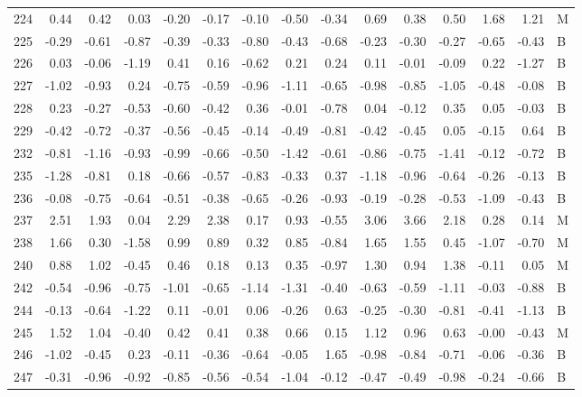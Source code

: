 \begin{table}[ht]
\begin{tabular}{rrrrrrrrrrrrrrl}
  224 & 0.44 & 0.42 & 0.03 & -0.20 & -0.17 & -0.10 & -0.50 & -0.34 & 0.69 & 0.38 & 0.50 & 1.68 & 1.21 & M \\ 
  225 & -0.29 & -0.61 & -0.87 & -0.39 & -0.33 & -0.80 & -0.43 & -0.68 & -0.23 & -0.30 & -0.27 & -0.65 & -0.43 & B \\ 
  226 & 0.03 & -0.06 & -1.19 & 0.41 & 0.16 & -0.62 & 0.21 & 0.24 & 0.11 & -0.01 & -0.09 & 0.22 & -1.27 & B \\ 
  227 & -1.02 & -0.93 & 0.24 & -0.75 & -0.59 & -0.96 & -1.11 & -0.65 & -0.98 & -0.85 & -1.05 & -0.48 & -0.08 & B \\ 
  228 & 0.23 & -0.27 & -0.53 & -0.60 & -0.42 & 0.36 & -0.01 & -0.78 & 0.04 & -0.12 & 0.35 & 0.05 & -0.03 & B \\ 
  229 & -0.42 & -0.72 & -0.37 & -0.56 & -0.45 & -0.14 & -0.49 & -0.81 & -0.42 & -0.45 & 0.05 & -0.15 & 0.64 & B \\ 
  232 & -0.81 & -1.16 & -0.93 & -0.99 & -0.66 & -0.50 & -1.42 & -0.61 & -0.86 & -0.75 & -1.41 & -0.12 & -0.72 & B \\ 
  235 & -1.28 & -0.81 & 0.18 & -0.66 & -0.57 & -0.83 & -0.33 & 0.37 & -1.18 & -0.96 & -0.64 & -0.26 & -0.13 & B \\ 
  236 & -0.08 & -0.75 & -0.64 & -0.51 & -0.38 & -0.65 & -0.26 & -0.93 & -0.19 & -0.28 & -0.53 & -1.09 & -0.43 & B \\ 
  237 & 2.51 & 1.93 & 0.04 & 2.29 & 2.38 & 0.17 & 0.93 & -0.55 & 3.06 & 3.66 & 2.18 & 0.28 & 0.14 & M \\ 
  238 & 1.66 & 0.30 & -1.58 & 0.99 & 0.89 & 0.32 & 0.85 & -0.84 & 1.65 & 1.55 & 0.45 & -1.07 & -0.70 & M \\ 
  240 & 0.88 & 1.02 & -0.45 & 0.46 & 0.18 & 0.13 & 0.35 & -0.97 & 1.30 & 0.94 & 1.38 & -0.11 & 0.05 & M \\ 
  242 & -0.54 & -0.96 & -0.75 & -1.01 & -0.65 & -1.14 & -1.31 & -0.40 & -0.63 & -0.59 & -1.11 & -0.03 & -0.88 & B \\ 
  244 & -0.13 & -0.64 & -1.22 & 0.11 & -0.01 & 0.06 & -0.26 & 0.63 & -0.25 & -0.30 & -0.81 & -0.41 & -1.13 & B \\ 
  245 & 1.52 & 1.04 & -0.40 & 0.42 & 0.41 & 0.38 & 0.66 & 0.15 & 1.12 & 0.96 & 0.63 & -0.00 & -0.43 & M \\ 
  246 & -1.02 & -0.45 & 0.23 & -0.11 & -0.36 & -0.64 & -0.05 & 1.65 & -0.98 & -0.84 & -0.71 & -0.06 & -0.36 & B \\ 
  247 & -0.31 & -0.96 & -0.92 & -0.85 & -0.56 & -0.54 & -1.04 & -0.12 & -0.47 & -0.49 & -0.98 & -0.24 & -0.66 & B \\ 

\end{tabular}
\end{table}

